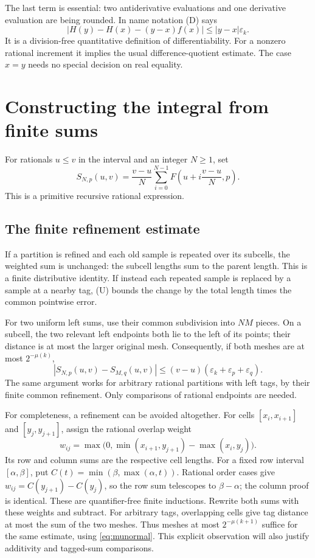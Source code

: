 \documentclass[11pt]{article}
\theoremstyle{definition}
\newcommand{\eps}{\varepsilon}
\newcommand{\abs}[1]{\left|#1\right|}
\begin{document}
The last term is essential: two antiderivative evaluations and one
derivative evaluation are being rounded.  In name notation (D) says
\[
 \abs{H(y)-H(x)-(y-x)f(x)}\le\abs{y-x}\eps_k.
\]
It is a division-free quantitative definition of differentiability.
For a nonzero rational increment it implies the usual difference-quotient
estimate.  The case \(x=y\) needs no special decision on real equality.

\section{Constructing the integral from finite sums}\label{sec:integral}

For rationals \(u\le v\) in the interval and an integer \(N\ge1\), set
\begin{equation}
 S_{N,p}(u,v)=\frac{v-u}{N}\sum_{i=0}^{N-1}
 F\!\left(u+i\frac{v-u}{N},p\right).\label{eq:sum}
\end{equation}
This is a primitive recursive rational expression.

\subsection{The finite refinement estimate}

If a partition is refined and each old sample is repeated over its
subcells, the weighted sum is unchanged: the subcell lengths sum to the
parent length.  This is a finite distributive identity.  If instead
each repeated sample is replaced by a sample at a nearby tag, (U) bounds
the change by the total length times the common pointwise error.

For two uniform left sums, use their common subdivision into \(NM\)
pieces.  On a subcell, the two relevant left endpoints both lie to the
left of its points; their distance is at most the larger original mesh.
Consequently, if both meshes are at most \(2^{-\mu(k)}\),
\begin{equation}
 \abs{S_{N,p}(u,v)-S_{M,q}(u,v)}
 \le (v-u)(\eps_k+\eps_p+\eps_q).\label{eq:refine}
\end{equation}
The same argument works for arbitrary rational partitions with left
tags, by their finite common refinement.  Only comparisons of rational
endpoints are needed.

For completeness, a refinement can be avoided altogether.  For cells
\([x_i,x_{i+1}]\) and \([y_j,y_{j+1}]\), assign the rational overlap
weight
\[
 w_{ij}=\max\bigl(0,\min(x_{i+1},y_{j+1})-\max(x_i,y_j)\bigr).
\]
Its row and column sums are the respective cell lengths.  For a fixed
row interval \([\alpha,\beta]\), put
\(C(t)=\min(\beta,\max(\alpha,t))\).  Rational order cases give
\(w_{ij}=C(y_{j+1})-C(y_j)\), so the row sum telescopes to
\(\beta-\alpha\); the column proof is identical.  These are
quantifier-free finite inductions.  Rewrite both sums with these weights
and subtract.  For arbitrary tags, overlapping cells give tag distance
at most the sum of the two meshes.  Thus meshes at most
\(2^{-\mu(k+1)}\) suffice for the same estimate, using
\eqref{eq:munormal}.  This explicit observation will also justify
additivity and tagged-sum comparisons.
\end{document}
